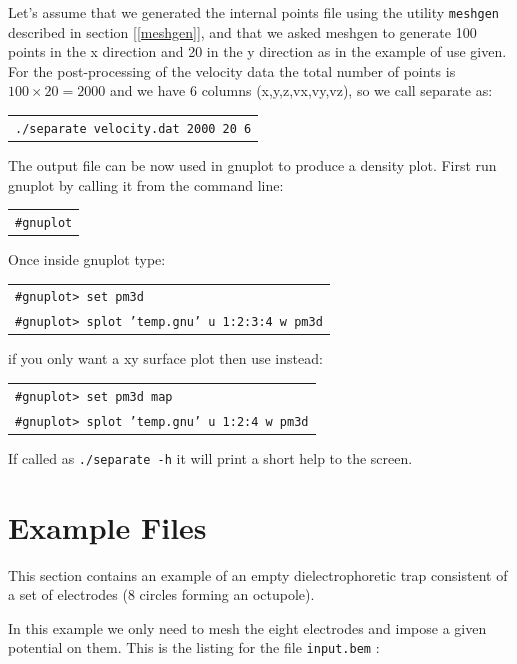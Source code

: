 \documentclass[12pt]{article}
\begin{document}
Let's assume that we generated the internal points file using the utility \verb+meshgen+ described in section [\ref{meshgen}], and that we asked meshgen to generate 100 points in the x direction and 20 in the y direction as in the example of use given. For the post-processing of the velocity data the total number of points is $100\times20=2000$ and we have 6 columns (x,y,z,vx,vy,vz), so we call separate as:

\begin{tabular}{l}
\texttt{./separate velocity.dat 2000 20 6}
\end{tabular}

The output file can be now used in gnuplot to produce a density plot. First run gnuplot by calling it from the command line:

\begin{tabular}{l}
\verb+#gnuplot+
\end{tabular}

Once inside gnuplot type:

\begin{tabular}{l}
\texttt{\#gnuplot> set pm3d}\\
\texttt{\#gnuplot> splot 'temp.gnu' u 1:2:3:4 w pm3d}
\end{tabular}

if you only want a xy surface plot then use instead:

\begin{tabular}{l}
\texttt{\#gnuplot> set pm3d map}\\
\texttt{\#gnuplot> splot 'temp.gnu' u 1:2:4 w pm3d}
\end{tabular}

If called as \verb+./separate -h+ it will print a short help to the screen.

\pagebreak
\section{Example Files}
This section contains an example of an empty dielectrophoretic trap consistent of a set of electrodes (8 circles forming an octupole).

In this example we only need to mesh the eight electrodes and impose a given potential on them. This is the listing for the file \verb+input.bem+ :
\end{document}

